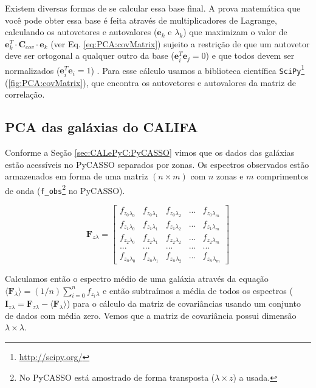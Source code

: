Existem diversas formas de se calcular essa base final. A prova matemática que
você pode obter essa base é feita através de multiplicadores de Lagrange,
calculando os autovetores e autovalores ($\mathbf{e}{}_k$ e $\lambda_k$) que
maximizam o valor de $\mathbf{e}{}_k^T \cdot \mathbf{C}{}_{cov} \cdot
\mathbf{e}{}_k$ (ver Eq. \ref{eq:PCA:covMatrix}) sujeito a restrição de que um
autovetor deve ser ortogonal a qualquer outro da base ($\mathbf{e}{}_i^T
\mathbf{e}{}_j = 0$) e que todos devem ser normalizados ($\mathbf{e}{}_i^T
\mathbf{e}{}_i = 1$) \citep[][p. 5-6]{JolliffePCA1986}. Para esse cálculo usamos
a biblioteca científica \texttt{SciPy}\footnote{\url{http://scipy.org/}}
(\ref{fig:PCA:covMatrix}), que encontra os autovetores e autovalores da matriz
de correlação.

\subsection{PCA das galáxias do CALIFA}

Conforme a Seção \ref{sec:CALePyC:PyCASSO} vimos que os dados das galáxias estão
acessíveis no PyCASSO separados por zonas. Os espectros observados estão
armazenados em forma de uma matriz $(n \times m)$ com $n$ zonas e $m$
comprimentos de onda (\texttt{f\_obs}\footnote{No PyCASSO está amostrado de
forma transposta ($\lambda \times z$) a usada.} no PyCASSO).

\begin{equation}
    \label{eq:PCA:fluxMatrix}
    \textbf{F}{}_{z \lambda} = \left[
    \begin{array}{ccccc}
        f_{z_0 \lambda_0} & f_{z_0 \lambda_1} & f_{z_0 \lambda_2} & ... & f_{z_0 \lambda_m} \\
        f_{z_1 \lambda_0} & f_{z_1 \lambda_1} & f_{z_1 \lambda_2} & ... & f_{z_1 \lambda_m} \\
        f_{z_2 \lambda_0} & f_{z_2 \lambda_1} & f_{z_2 \lambda_2} & ... & f_{z_2 \lambda_m} \\
        ...               & ...               & ...               & ... & ...               \\
        f_{z_n \lambda_0} & f_{z_n \lambda_1} & f_{z_n \lambda_2} & ... & f_{z_n \lambda_m} 
    \end{array} 
    \right]
\end{equation}

Calculamos então o espectro médio de uma galáxia através da equação $\langle
\textbf{F}{}_\lambda \rangle = (1 / n) \sum_{i=0}^{n} f_{z_i}{}_{\lambda}$ e
então subtraímos a média de todos os espectros ($\textbf{I}{}_{z \lambda} =
\textbf{F}{}_{z \lambda} - \langle \textbf{F}{}_\lambda \rangle$) para o cálculo
da matriz de covariâncias usando um conjunto de dados com média zero. Vemos que
a matriz de covariância possui dimensão $\lambda \times \lambda$. 

